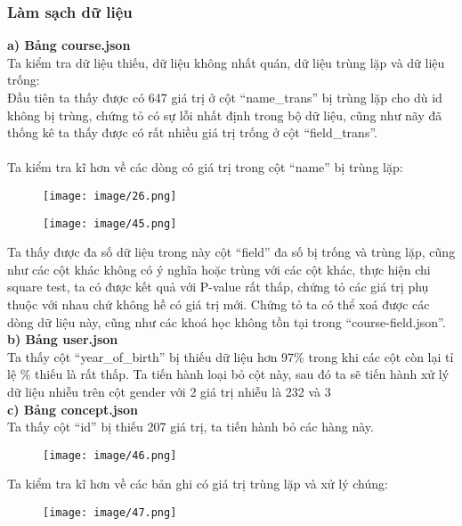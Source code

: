 \subsubsection{Làm sạch dữ liệu}
\textbf{a) Bảng course.json}\\
Ta kiểm tra dữ liệu thiếu, dữ liệu không nhất quán, dữ liệu trùng lặp và dữ liệu trống:
\\
Đầu tiên ta thấy được có 647 giá trị ở cột “name\_trans” bị trùng lặp cho dù id không bị trùng, chứng tỏ có sự lỗi nhất định trong bộ dữ liệu, cũng như nãy đã thống kê ta thấy được có rất nhiều giá trị trống ở cột “field\_trans”.\\
\\
Ta kiểm tra kĩ hơn về các dòng có giá trị trong cột “name” bị trùng lặp:
\begin{figure}[h]
    \centering
    \texttt{[image: image/26.png]}
\end{figure}
\newpage
\begin{figure}
    \centering
    \texttt{[image: image/45.png]}
\end{figure}
Ta thấy được đa số dữ liệu trong này cột “field” đa số bị trống và trùng lặp, cũng như các cột khác không có ý nghĩa hoặc trùng với các cột khác, thực hiện chi square test, ta có được kết quả với P-value rất thấp, chứng tỏ các giá trị phụ thuộc với nhau chứ không hề có giá trị mới. Chứng tỏ ta có thể xoá được các dòng dữ liệu này, cũng như các khoá học không tồn tại trong “course-field.json”.\\
\textbf{b) Bảng user.json}\\
Ta thấy cột “year\_of\_birth” bị thiếu dữ liệu hơn 97\% trong khi các cột còn lại tỉ lệ \% thiếu là rất thấp. Ta tiến hành loại bỏ cột này, sau đó ta sẽ tiến hành xử lý dữ liệu nhiễu trên cột gender với 2 giá trị nhiễu là 232 và 3\\
\textbf{c) Bảng concept.json}\\
Ta thấy cột “id” bị thiếu 207 giá trị, ta tiến hành bỏ các hàng này.\\
\begin{figure}[h]
    \centering
    \texttt{[image: image/46.png]}
\end{figure}
\newpage
Ta kiểm tra kĩ hơn về các bản ghi có giá trị trùng lặp và xử lý chúng:\\
\begin{figure}[h]
    \centering
    \texttt{[image: image/47.png]}
\end{figure}\\
